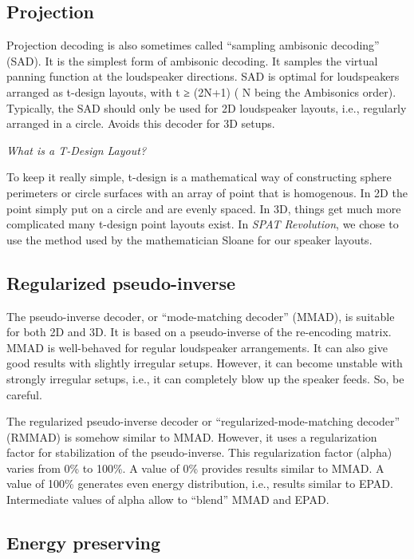 \documentclass[
  letterpaper,
  DIV=11,
  numbers=noendperiod]{scrreport}
\begin{document}
\hypertarget{projection}{%
\subsection{Projection}\label{projection}}

Projection decoding is also sometimes called ``sampling ambisonic
decoding'' (SAD). It is the simplest form of ambisonic decoding. It
samples the virtual panning function at the loudspeaker directions. SAD
is optimal for loudspeakers arranged as t-design layouts, with t ≥
(2N+1) ( N being the Ambisonics order). Typically, the SAD should only
be used for 2D loudspeaker layouts, i.e., regularly arranged in a
circle. Avoids this decoder for 3D setups.

\emph{What is a T-Design Layout?}

To keep it really simple, t-design is a mathematical way of constructing
sphere perimeters or circle surfaces with an array of point that is
homogenous. In 2D the point simply put on a circle and are evenly
spaced. In 3D, things get much more complicated many t-design point
layouts exist. In \emph{SPAT Revolution}, we chose to use the method
used by the mathematician Sloane for our speaker layouts.

\hypertarget{regularized-pseudo-inverse}{%
\subsection{Regularized
pseudo-inverse}\label{regularized-pseudo-inverse}}

The pseudo-inverse decoder, or ``mode-matching decoder'' (MMAD), is
suitable for both 2D and 3D. It is based on a pseudo-inverse of the
re-encoding matrix. MMAD is well-behaved for regular loudspeaker
arrangements. It can also give good results with slightly irregular
setups. However, it can become unstable with strongly irregular setups,
i.e., it can completely blow up the speaker feeds. So, be careful.

The regularized pseudo-inverse decoder or ``regularized-mode-matching
decoder'' (RMMAD) is somehow similar to MMAD. However, it uses a
regularization factor for stabilization of the pseudo-inverse. This
regularization factor (alpha) varies from 0\% to 100\%. A value of 0\%
provides results similar to MMAD. A value of 100\% generates even energy
distribution, i.e., results similar to EPAD. Intermediate values of
alpha allow to ``blend'' MMAD and EPAD.

\hypertarget{energy-preserving}{%
\subsection{Energy preserving}\label{energy-preserving}}
\end{document}
